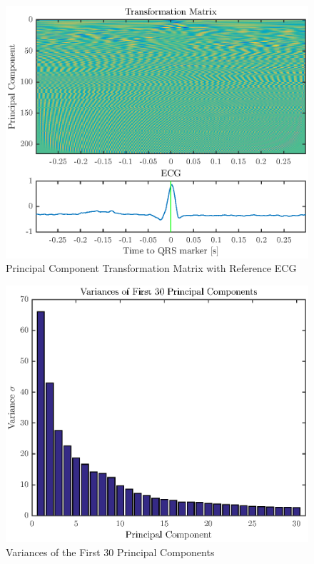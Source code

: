 \documentclass[titlepage,12pt,letter]{article}
\begin{document}
\begin{figure}[htbp]
    \centering
    \includegraphics[height=0.42\textheight]{../figures/train_01}
    \caption{Principal Component Transformation Matrix with Reference ECG}
    \label{fig:transform}
\end{figure}

\begin{figure}[htbp]
    \centering
    \includegraphics[height=0.42\textheight]{../figures/train_02}
    \caption{Variances of the First 30 Principal Components}
    \label{fig:var}
\end{figure}
\end{document}
